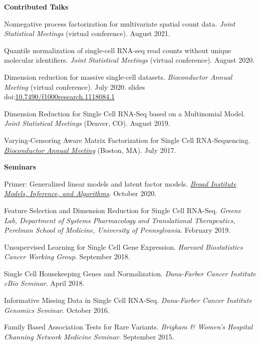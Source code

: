 \documentclass[10pt]{article}
\newcommand\doilink[1]{\href{https://dx.doi.org/#1}{#1}}
\newcommand\doi[1]{doi:\doilink{#1}}
\begin{document}
\textbf{Contributed Talks}
\begin{enumerate}[label= {[\arabic*]}]
\item Nonnegative process factorization for multivariate spatial count data. {\it Joint Statistical Meetings} (virtual conference). August 2021.
\item Quantile normalization of single-cell RNA-seq read counts without unique molecular identifiers. {\it Joint Statistical Meetings} (virtual conference). August 2020.
\item Dimension reduction for massive single-cell datasets. {\it Bioconductor Annual Meeting} (virtual conference). July 2020. slides \doi{10.7490/f1000research.1118084.1}
\item Dimension Reduction for Single Cell RNA-Seq based on a Multinomial Model. {\it Joint Statistical Meetings} (Denver, CO). August 2019.
\item Varying-Censoring Aware Matrix Factorization for Single Cell RNA-Sequencing. \href{https://www.bioconductor.org/help/course-materials/2017/BioC2017/}{{\it Bioconductor Annual Meeting}} (Boston, MA). July 2017.
\end{enumerate}

\textbf{Seminars}
\begin{enumerate}[label= {[\arabic*]}]
\item Primer: Generalized linear models and latent factor models. \href{https://www.broadinstitute.org/talks/primer-generalized-linear-models-and-latent-factor-models}{{\it Broad Institute Models, Inference, and Algorithms}}. October 2020.
\item Feature Selection and Dimension Reduction for Single Cell RNA-Seq. {\it Greene Lab, Department of Systems Pharmacology and Translational Therapeutics, Perelman School of Medicine, University of Pennsylvania}. February 2019.
\item Unsupervised Learning for Single Cell Gene Expression. {\it Harvard Biostatistics Cancer Working Group}. September 2018.
\item Single Cell Housekeeping Genes and Normalization. {\it Dana-Farber Cancer Institute cBio Seminar}. April 2018.
\item Informative Missing Data in Single Cell RNA-Seq. {\it Dana-Farber Cancer Institute Genomics Seminar}. October 2016.
\item Family Based Association Tests for Rare Variants. {\it Brigham \& Women's Hospital Channing Network Medicine Seminar}. September 2015.
\end{enumerate}
\end{document}
